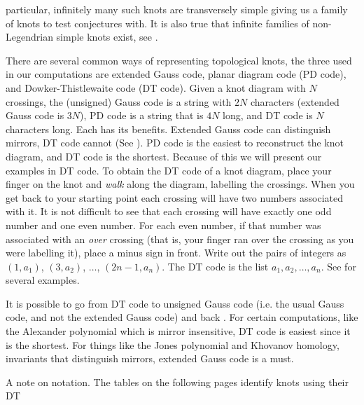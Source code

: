 \documentclass{article}
\theoremstyle{plain}
\begin{document}
        particular, infinitely many such knots are transversely simple giving
        us a family of knots to test conjectures with. It is also true that
        infinite families of non-Legendrian simple knots exist,
        see \cite{vfoldvari2019legnonsimple}.
        \par\hfill\par
        There are several common ways of representing topological knots, the
        three used in our computations are extended Gauss code, planar diagram
        code (PD code), and Dowker-Thistlewaite code (DT code). Given a knot
        diagram with $N$ crossings, the (unsigned) Gauss code is a string with $2N$
        characters (extended Gauss code is $3N$),
        PD code is a string that is $4N$ long, and DT code is $N$
        characters long. Each has its benefits. Extended Gauss code
        can distinguish mirrors, DT code cannot
        (See \cite{DOWKER198319}). PD code is the easiest to
        reconstruct the knot diagram, and DT code is the shortest. Because of
        this we will present our examples in DT code. To obtain the DT code of
        a knot diagram, place your finger on the knot and \textit{walk} along
        the diagram, labelling the crossings. When you get back to your starting
        point each crossing will have two numbers associated with it. It is
        not difficult to see that each crossing will have exactly one odd number
        and one even number. For each even number, if that number was associated
        with an \textit{over} crossing (that is, your finger ran over the
        crossing as you were labelling it), place a minus sign in front. Write
        out the pairs of integers as $(1,a_{1})$, $(3,a_{2})$, $\dots$,
        $(2n-1,a_{n})$. The DT code is the list $a_{1},a_{2},\dots,a_{n}$.
        See \cite{KatlasDTCode} for several examples.
        \par\hfill\par
        It is possible to go from DT code to unsigned
        Gauss code (i.e. the usual Gauss code, and not the extended Gauss code)
        and back \cite{KhoHoDTCodes}. For certain computations,
        like the Alexander polynomial which
        is mirror insensitive, DT code is easiest since it is the shortest.
        For things like the Jones polynomial and Khovanov homology, invariants
        that distinguish mirrors, extended Gauss code is a must.
        \par\hfill\par
        A note on notation. The tables on the following pages identify knots using their DT
\end{document}
